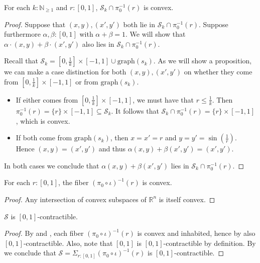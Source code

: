 \begin{lemma}
  For each $k:\mathbb N_{\geq 1}$ and $r:[0,1]$, $\mathcal S_k\cap \pi_0^{-1}(r)$ is convex.
\end{lemma}
\begin{proof}
  Suppose that $(x,y), (x',y')$ both lie in $\mathcal S_k\cap \pi_0^{-1}(r)$.
  Suppose furthermore $\alpha,\beta:[0,1]$ with $\alpha+ \beta = 1$. 
  We will show that $\alpha\cdot (x,y) + \beta\cdot (x',y') $ also lies in
  $\mathcal S_k \cap \pi_0^{-1}(r)$.

  Recall that 
  $\mathcal S_k = [0,\frac1k] \times [-1,1]  \cup \mathrm{graph}(s_k)$. 
  As we will show a proposition, we can make a case distinction 
  for both $(x,y), (x',y')$ on whether they come from $[0,\frac 1k] \times [-1,1]$ or 
  from $\mathrm{graph}(s_k)$.
  \begin{itemize}
    \item 
      If either comes from $[0,\frac1k] \times [-1,1]$, we must have that
      $r \leq \frac1k$.
      Then $\pi_0^{-1}(r) = \{r\} \times [-1,1]\subseteq \mathcal S_k$.
      It follows that $\mathcal S_k \cap \pi_0^{-1}(r) = \{r\} \times [-1, 1]$, which is convex. 
    \item 
      If both come from $\mathrm{graph}(s_k)$,
      then $x = x' = r$ and $y = y' = \sin(\frac1r)$. 
      Hence $(x,y) = (x',y')$ and thus $\alpha(x,y) + \beta(x',y') = (x',y')$. 
  \end{itemize}
  In both cases we conclude that $\alpha (x,y) + \beta(x',y')$ lies in
  $\mathcal S_k\cap \pi_0^{-1}(r)$.
\end{proof}

\begin{corollary}\label{fiberConvex}
  For each $r:[0,1]$, the fiber 
  $(\pi_0\circ\iota)^{-1}(r)$
  is convex. 
\end{corollary}
\begin{proof}
  Any intersection of convex subspaces of $\mathbb R^n$ is itself convex.
\end{proof}
\begin{theorem}
  $\mathcal S$ is $[0,1]$-contractible. 
\end{theorem}
\begin{proof}
  By  and , each fiber $(\pi_0\circ\iota)^{-1}(r)$ is convex and inhabited, hence by  also $[0,1]$-contractible. 
  Also, note that $[0,1]$ is $[0,1]$-contractible by definition. 
  By  we conclude that  
  $\mathcal S = \Sigma_{r:[0,1]} (\pi_0\circ\iota)^{-1}(r)$ is $[0,1]$-contractible. 
%
\end{proof}
